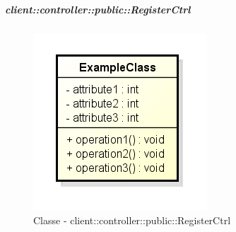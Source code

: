 		\subparagraph{client::controller::public::RegisterCtrl} %
		\label{subp:bdsm_app_client_controller_public_registerctrl}
			\begin{figure}[htbp]
				\centering
				\centerline{\includegraphics[scale=0.7]{./images/client/classes/example_class.png}}
				\caption{Classe - client::controller::public::RegisterCtrl}
			\end{figure}
